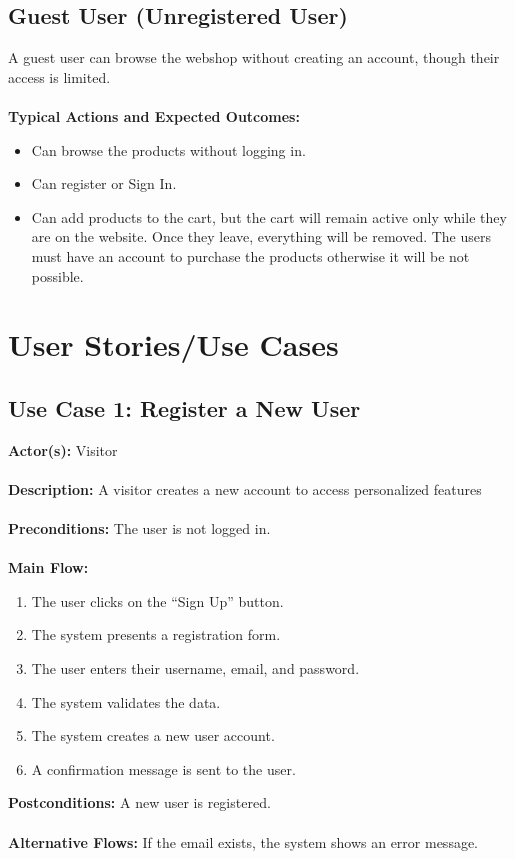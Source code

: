 \documentclass[a4paper,12pt]{article}
\begin{document}
	\subsection*{Guest User (Unregistered User)}
	A guest user can browse the webshop without creating an account, though their access is limited. \\ \\
	\textbf{Typical Actions and Expected Outcomes:}
	\begin{itemize}
		\item Can browse the products without logging in.
		\item Can register or Sign In.
		\item Can add products to the cart, but the cart will remain active only while they are on the website. Once they leave, everything will be removed. The users must have an account to purchase the products otherwise it will be not possible.
	\end{itemize}

	\section{User Stories/Use Cases}

	\subsection*{Use Case 1: Register a New User}
	\textbf{Actor(s):} Visitor \\ \\
	\textbf{Description:} A visitor creates a new account to access personalized features \\ \\
	\textbf{Preconditions:} The user is not logged in. \\ \\
	\textbf{Main Flow:}
	\begin{enumerate}
    		\item The user clicks on the ``Sign Up'' button.
    		\item The system presents a registration form.
    		\item The user enters their username, email, and password.
    		\item The system validates the data.
    		\item The system creates a new user account.
    		\item A confirmation message is sent to the user.
    \end{enumerate}
    \textbf{Postconditions:} A new user is registered. \\ \\
    \textbf{Alternative Flows:} If the email exists, the system shows an error message.
\end{document}
